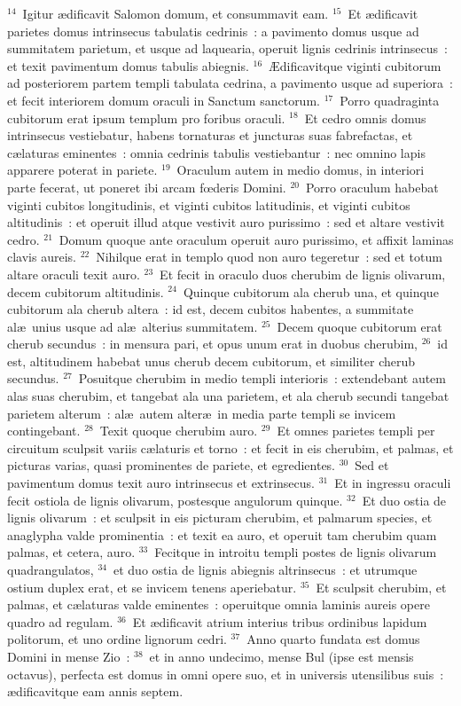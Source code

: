 ${}^{14}$~Igitur \ae dificavit Salomon domum, et consummavit eam.
${}^{15}$~Et \ae dificavit parietes domus intrinsecus tabulatis cedrinis~: a pavimento domus usque ad summitatem parietum, et usque ad laquearia, operuit lignis cedrinis intrinsecus~: et texit pavimentum domus tabulis abiegnis.
${}^{16}$~\AE dificavitque viginti cubitorum ad posteriorem partem templi tabulata cedrina, a pavimento usque ad superiora~: et fecit interiorem domum oraculi in Sanctum sanctorum.
${}^{17}$~Porro quadraginta cubitorum erat ipsum templum pro foribus oraculi.
${}^{18}$~Et cedro omnis domus intrinsecus vestiebatur, habens tornaturas et juncturas suas fabrefactas, et c\ae laturas eminentes~: omnia cedrinis tabulis vestiebantur~: nec omnino lapis apparere poterat in pariete.
${}^{19}$~Oraculum autem in medio domus, in interiori parte fecerat, ut poneret ibi arcam fœderis Domini.
${}^{20}$~Porro oraculum habebat viginti cubitos longitudinis, et viginti cubitos latitudinis, et viginti cubitos altitudinis~: et operuit illud atque vestivit auro purissimo~: sed et altare vestivit cedro.
${}^{21}$~Domum quoque ante oraculum operuit auro purissimo, et affixit laminas clavis aureis.
${}^{22}$~Nihilque erat in templo quod non auro tegeretur~: sed et totum altare oraculi texit auro.
${}^{23}$~Et fecit in oraculo duos cherubim de lignis olivarum, decem cubitorum altitudinis.
${}^{24}$~Quinque cubitorum ala cherub una, et quinque cubitorum ala cherub altera~: id est, decem cubitos habentes, a summitate al\ae\ unius usque ad al\ae\ alterius summitatem.
${}^{25}$~Decem quoque cubitorum erat cherub secundus~: in mensura pari, et opus unum erat in duobus cherubim,
${}^{26}$~id est, altitudinem habebat unus cherub decem cubitorum, et similiter cherub secundus.
${}^{27}$~Posuitque cherubim in medio templi interioris~: extendebant autem alas suas cherubim, et tangebat ala una parietem, et ala cherub secundi tangebat parietem alterum~: al\ae\ autem alter\ae\ in media parte templi se invicem contingebant.
${}^{28}$~Texit quoque cherubim auro.
${}^{29}$~Et omnes parietes templi per circuitum sculpsit variis c\ae laturis et torno~: et fecit in eis cherubim, et palmas, et picturas varias, quasi prominentes de pariete, et egredientes.
${}^{30}$~Sed et pavimentum domus texit auro intrinsecus et extrinsecus.
${}^{31}$~Et in ingressu oraculi fecit ostiola de lignis olivarum, postesque angulorum quinque.
${}^{32}$~Et duo ostia de lignis olivarum~: et sculpsit in eis picturam cherubim, et palmarum species, et anaglypha valde prominentia~: et texit ea auro, et operuit tam cherubim quam palmas, et cetera, auro.
${}^{33}$~Fecitque in introitu templi postes de lignis olivarum quadrangulatos,
${}^{34}$~et duo ostia de lignis abiegnis altrinsecus~: et utrumque ostium duplex erat, et se invicem tenens aperiebatur.
${}^{35}$~Et sculpsit cherubim, et palmas, et c\ae laturas valde eminentes~: operuitque omnia laminis aureis opere quadro ad regulam.
${}^{36}$~Et \ae dificavit atrium interius tribus ordinibus lapidum politorum, et uno ordine lignorum cedri.
${}^{37}$~Anno quarto fundata est domus Domini in mense Zio~:
${}^{38}$~et in anno undecimo, mense Bul (ipse est mensis octavus), perfecta est domus in omni opere suo, et in universis utensilibus suis~: \ae dificavitque eam annis septem.

